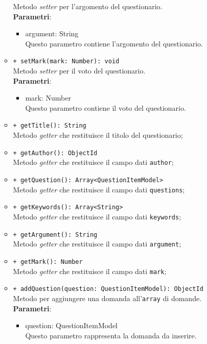 \begin{itemize}
\begin{itemize}
				Metodo \textit{setter} per l'argomento del questionario.\\
				\textbf{Parametri}:
				\begin{itemize}
					\item {argument: String}\\
					Questo parametro contiene l'argomento del questionario. 
				\end{itemize}
				\item \texttt{+ setMark(mark: Number): void} \\
				Metodo \textit{setter} per il voto del questionario.\\
				\textbf{Parametri}:
				\begin{itemize}
					\item {mark: Number}\\
					Questo parametro contiene il voto del questionario. 
				\end{itemize}
				\item \texttt{+ getTitle(): String} \\
				Metodo \textit{getter} che restituisce il titolo del questionario;
				
				\item \texttt{+ getAuthor(): ObjectId} \\
				Metodo \textit{getter} che restituisce il campo dati \texttt{author};
				
				\item \texttt{+ getQuestion(): Array<QuestionItemModel>} \\
				Metodo \textit{getter} che restituisce il campo dati \texttt{questions};

				\item \texttt{+ getKeywords(): Array<String>} \\
				Metodo \textit{getter} che restituisce il campo dati \texttt{keywords};
				
				\item \texttt{+ getArgument(): String} \\
				Metodo \textit{getter} che restituisce il campo dati \texttt{argument};
				
				\item \texttt{+ getMark(): Number} \\
				Metodo \textit{getter} che restituisce il campo dati \texttt{mark};
				
				\item \texttt{+ addQuestion(question: QuestionItemModel): ObjectId} \\
				Metodo per aggiungere una domanda all'\texttt{array} di domande.\\
				\textbf{Parametri}:
				\begin{itemize}
					\item {question: QuestionItemModel}\\
					Questo parametro rappresenta la domanda da inserire.
				\end{itemize}
				

\end{itemize}
\end{itemize}
